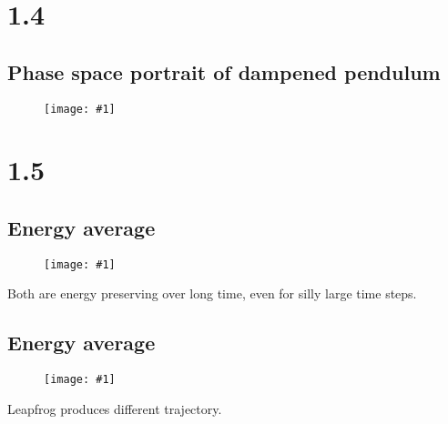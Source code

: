 \documentclass[11pt]{article}
\newcommand{\singlefigure}[1]{
\begin{figure}[H]
  \centering
  \begin{minipage}{0.4\textwidth}
    \centering
    \texttt{[image: \#1]}
  \end{minipage}
\end{figure}
}
\begin{document}
\section*{1.4}
\subsection*{Phase space portrait of dampened pendulum}
\singlefigure{./plots/1_4/study.png}

\section*{1.5}
\subsection*{Energy average}
\singlefigure{./plots/1_5/study.png}
Both are energy preserving over long time, even for silly large time steps.

\subsection*{Energy average}
\singlefigure{./plots/1_5/study2.png}
Leapfrog produces different trajectory.

\end{document}
